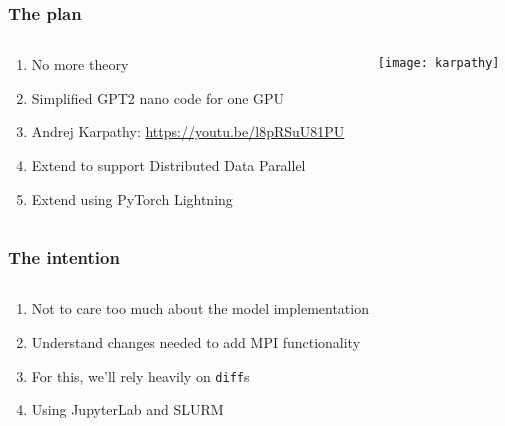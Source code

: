 \documentclass[
	notes=none,
	aspectratio=169
]{beamer}
\begin{document}

\begin{frame}
\frametitle{The plan}

\begin{columns}[T]
\begin{column}[T]{0.7\textwidth}
\setlength{\parskip}{0.5em}

\vspace{0.0cm}
\begin{enumerate}
\setlength{\parskip}{0.5em}
\item No more theory
\item Simplified GPT2 nano code for one GPU
\item Andrej Karpathy: \url{https://youtu.be/l8pRSuU81PU}
\item Extend to support Distributed Data Parallel
\item Extend using PyTorch Lightning
\end{enumerate}

\end{column}
\begin{column}[T]{0.3\textwidth}
\setlength{\parskip}{0.5em}

\vspace{0.0cm}
\texttt{[image: karpathy]}

\end{column}
\end{columns}

\end{frame}
\note{
}


\begin{frame}
\frametitle{The intention}

\begin{columns}[T]
\begin{column}[T]{1.0\textwidth}
\setlength{\parskip}{0.5em}

\vspace{0.0cm}
\begin{enumerate}
\setlength{\parskip}{0.5em}
\item Not to care too much about the model implementation
\item Understand changes needed to add MPI functionality
\item For this, we'll rely heavily on {\tt diff}s
\item Using JupyterLab and SLURM
\end{enumerate}

\end{column}
\end{columns}

\end{frame}
\note{
}
\end{document}
